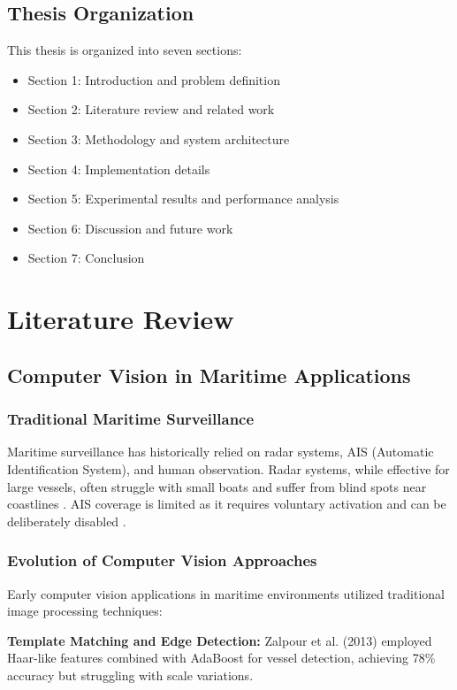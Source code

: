 \documentclass[twoside]{article}
\begin{document}
\begin{multicols}{2}
\subsection{Thesis Organization}
This thesis is organized into seven sections:
\begin{itemize}
    \item Section 1: Introduction and problem definition
    \item Section 2: Literature review and related work
    \item Section 3: Methodology and system architecture
    \item Section 4: Implementation details
    \item Section 5: Experimental results and performance analysis
    \item Section 6: Discussion and future work
    \item Section 7: Conclusion
\end{itemize}

\section{Literature Review}

\subsection{Computer Vision in Maritime Applications}

\subsubsection{Traditional Maritime Surveillance}
Maritime surveillance has historically relied on radar systems, AIS (Automatic Identification System), and human observation. Radar systems, while effective for large vessels, often struggle with small boats and suffer from blind spots near coastlines \cite{greidanus2006detection}. AIS coverage is limited as it requires voluntary activation and can be deliberately disabled \cite{iphar2020data}.

\subsubsection{Evolution of Computer Vision Approaches}
Early computer vision applications in maritime environments utilized traditional image processing techniques:

\textbf{Template Matching and Edge Detection:} Zalpour et al. (2013) \cite{zalpour2013vessel} employed Haar-like features combined with AdaBoost for vessel detection, achieving 78\% accuracy but struggling with scale variations.


\end{multicols}
\end{document}
